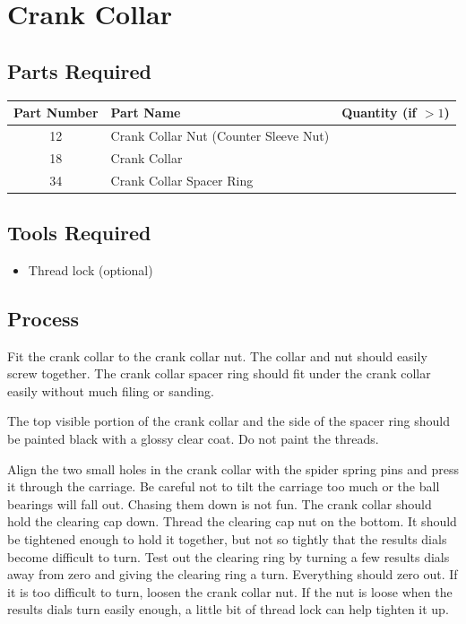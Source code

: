 \documentclass[openany]{book}
\begin{document}
\chapter{Crank Collar}
\section{Parts Required}
\begin{table}[!ht]
	\centering
	\begin{tabular}{clc}
		Part Number & Part Name & Quantity (if $>1$) \\ \hline
		 12 & Crank Collar Nut (Counter Sleeve Nut) & \\
		 18 & Crank Collar & \\
		 34 & Crank Collar Spacer Ring &\\
	\end{tabular}
\end{table}

\section{Tools Required}
\begin{itemize}
	\item Thread lock (optional)
\end{itemize}


\section{Process}
Fit the crank collar to the crank collar nut. The collar and nut should easily screw together. The crank collar spacer ring should fit under the crank collar easily without much filing or sanding.

The top visible portion of the crank collar and the side of the spacer ring should be painted black with a glossy clear coat. Do not paint the threads.

Align the two small holes in the crank collar with the spider spring pins and press it through the carriage. Be careful not to tilt the carriage too much or the ball bearings will fall out. Chasing them down is not fun. The crank collar should hold the clearing cap down. Thread the clearing cap nut on the bottom. It should be tightened enough to hold it together, but not so tightly that the results dials become difficult to turn. Test out the clearing ring by turning a few results dials away from zero and giving the clearing ring a turn. Everything should zero out. If it is too difficult to turn, loosen the crank collar nut. If the nut is loose when the results dials turn easily enough, a little bit of thread lock can help tighten it up.
\end{document}
